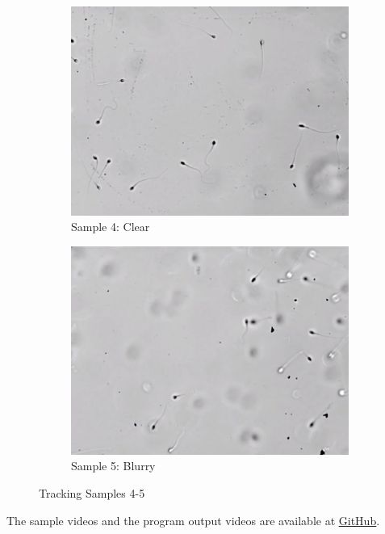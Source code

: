 \begin{figure}[h]
     \centering
     \begin{subfigure}[b]{0.46\textwidth}
         \centering
         \includegraphics[width=\textwidth]{Images/clear.png}
         \caption{Sample 4: Clear}
         \label{sam4}
     \end{subfigure}
     \hfill
     \begin{subfigure}[b]{0.46\textwidth}
         \centering
         \includegraphics[width=\textwidth]{Images/blurry.png}
         \caption{Sample 5: Blurry}
         \label{sam5}
     \end{subfigure}
        \caption{Tracking Samples 4-5}
        \label{sam4-5}
\end{figure}
The sample videos and the program output videos are available at \href{https://github.com/rladntjr7/FYP}{\underline{GitHub}}.


